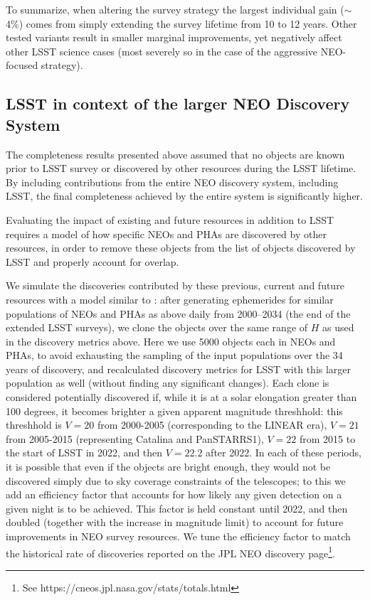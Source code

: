 To summarize, when altering the survey strategy the largest individual gain ($\sim$4\%) comes from simply extending the survey lifetime from 10 to 12 years. Other tested variants result in smaller marginal improvements, yet negatively affect other LSST science cases (most severely so in the case of the aggressive NEO-focused strategy).

\subsection{LSST in context of the larger NEO Discovery System\label{sec:known}}

The completeness results presented above assumed that no objects are known prior to LSST survey or 
discovered by other resources during the LSST lifetime. By including contributions from the entire NEO 
discovery system, including LSST, the final completeness achieved by the entire system is significantly higher.

Evaluating the impact of existing and future resources in addition to LSST requires a model of how 
specific NEOs and PHAs are discovered by other resources, in order to remove these objects
from the list of objects discovered by LSST and properly account for overlap. 

We simulate the discoveries contributed by these previous, current and future resources 
with a model similar to \citet{VeresChesley2017neo}: 
after generating ephemerides for similar populations of NEOs and PHAs as above daily from 2000--2034 
(the end of the extended LSST surveys), we clone the objects over the same range of $H$ as 
used in the discovery metrics above. Here we use 5000 objects each in NEOs and PHAs, to avoid
exhausting the sampling of the input populations over the 34 years of discovery, and recalculated 
discovery metrics for LSST with this larger population as well (without finding any significant changes). 
Each clone is considered potentially discovered if, while it is at
a solar elongation greater than 100 degrees, it becomes brighter a given apparent magnitude threshhold: 
this threshhold is $V=20$ from 2000-2005 (corresponding to the LINEAR era), $V=21$ from 2005-2015 
(representing Catalina and PanSTARRS1), $V=22$ from 2015 to the start of LSST in 2022, and then
$V=22.2$ after 2022.  In each of these periods, it is possible that even if the objects are bright enough, 
they would not be discovered simply due to sky coverage constraints of the telescopes; to 
this we add an efficiency factor that accounts for how likely any given detection on a given night is to be achieved. 
This factor is held constant until 2022, and then doubled (together with the increase in magnitude 
limit) to account for future improvements in NEO survey resources. We tune the efficiency factor to match
the historical rate of discoveries reported on the JPL NEO discovery page\footnote{See https://cneos.jpl.nasa.gov/stats/totals.html}.

